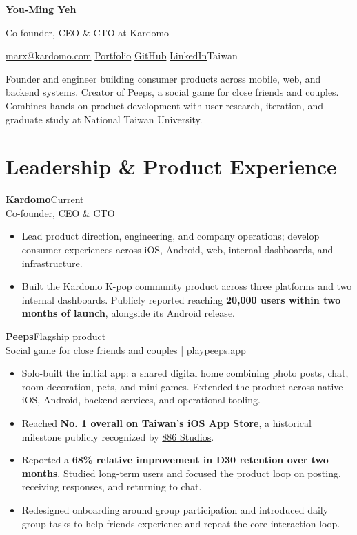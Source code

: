 \documentclass[10pt,a4paper]{article}
\newcommand{\entry}[3]{\textbf{#1}\hfill{\small\color{muted}#2}\\{\small #3}\par}
\begin{document}
{\fontsize{29}{33}\selectfont\bfseries You-Ming Yeh}

{\large Co-founder, CEO \& CTO at Kardomo}

\href{mailto:marx@kardomo.com}{marx@kardomo.com}\quad
\href{https://yym.vercel.app}{Portfolio}\quad
\href{https://github.com/YouMingYeh}{GitHub}\quad
\href{https://www.linkedin.com/in/you-ming-yeh-00b50b272/}{LinkedIn}\hfill Taiwan

\vspace{4pt}
Founder and engineer building consumer products across mobile, web, and backend systems. Creator of Peeps, a social game for close friends and couples. Combines hands-on product development with user research, iteration, and graduate study at National Taiwan University.

\section{Leadership \& Product Experience}
\entry{Kardomo}{Current}{Co-founder, CEO \& CTO}
\begin{itemize}
\item Lead product direction, engineering, and company operations; develop consumer experiences across iOS, Android, web, internal dashboards, and infrastructure.
\item Built the Kardomo K-pop community product across three platforms and two internal dashboards. Publicly reported reaching \textbf{20,000 users within two months of launch}, alongside its Android release.
\end{itemize}

\entry{Peeps}{Flagship product}{Social game for close friends and couples \enspace | \enspace \href{https://playpeeps.app}{playpeeps.app}}
\begin{itemize}
\item Solo-built the initial app: a shared digital home combining photo posts, chat, room decoration, pets, and mini-games. Extended the product across native iOS, Android, backend services, and operational tooling.
\item Reached \textbf{No. 1 overall on Taiwan's iOS App Store}, a historical milestone publicly recognized by \href{https://www.linkedin.com/posts/886studios_congrats-to-peeps-one-of-the-teams-in-our-activity-7462441723927896064-CiVc}{886 Studios}.
\item Reported a \textbf{68\% relative improvement in D30 retention over two months}. Studied long-term users and focused the product loop on posting, receiving responses, and returning to chat.
\item Redesigned onboarding around group participation and introduced daily group tasks to help friends experience and repeat the core interaction loop.
\end{itemize}
\end{document}
